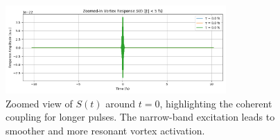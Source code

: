 \documentclass{article}
\begin{document}
\begin{figure}[h!]
  \centering
  \includegraphics[width=0.75\textwidth]{vam_time_response_zoom_plot}
  \caption{Zoomed view of $S(t)$ around $t = 0$, highlighting the coherent coupling for longer pulses. The narrow-band excitation leads to smoother and more resonant vortex activation.}
\end{figure}
\end{document}
